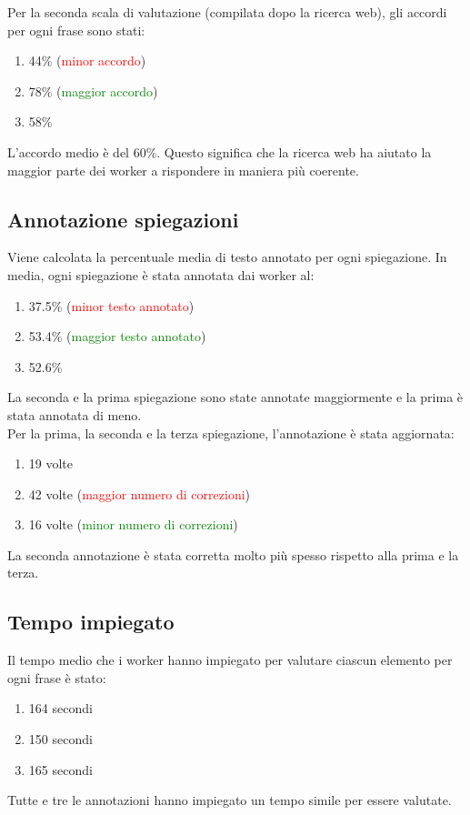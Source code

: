 \documentclass[a4paper, 11pt, twoside]{article}
\begin{document}
Per la seconda scala di valutazione (compilata dopo la ricerca web), gli accordi per ogni frase sono stati:
\begin{enumerate}
    \item 44\% (\textcolor{red}{minor accordo})
    \item 78\% (\textcolor{green}{maggior accordo})
    \item 58\%
\end{enumerate}
L'accordo medio è del 60\%. Questo significa che la ricerca web ha aiutato la maggior parte dei worker a rispondere in maniera più coerente.

\subsection{Annotazione spiegazioni}
Viene calcolata la percentuale media di testo annotato per ogni spiegazione. In media, ogni spiegazione è stata annotata dai worker al:
\begin{enumerate}
    \item 37.5\% (\textcolor{red}{minor testo annotato})
    \item 53.4\% (\textcolor{green}{maggior testo annotato})
    \item 52.6\%
\end{enumerate}
La seconda e la prima spiegazione sono state annotate maggiormente e la prima è stata annotata di meno. \\

Per la prima, la seconda e la terza spiegazione, l'annotazione è stata aggiornata:
\begin{enumerate}
    \item 19 volte
    \item 42 volte (\textcolor{red}{maggior numero di correzioni})
    \item 16 volte (\textcolor{green}{minor numero di correzioni})
\end{enumerate}
La seconda annotazione è stata corretta molto più spesso rispetto alla prima e la terza.

\subsection{Tempo impiegato}
Il tempo medio che i worker hanno impiegato per valutare ciascun elemento per ogni frase è stato:
\begin{enumerate}
    \item 164 secondi
    \item 150 secondi
    \item 165 secondi
\end{enumerate}
Tutte e tre le annotazioni hanno impiegato un tempo simile per essere valutate.
\end{document}

